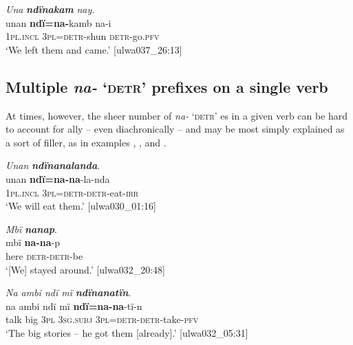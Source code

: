 \ea%
    \label{ex:syntax:340}
          \textit{Una} \textbf{\textit{ndïnakam}} \textit{nay.}\\
\gll    unan    \textbf{ndï=na-}kamb    na-i\\
    1\textsc{pl.incl}  \textsc{3pl=detr-}shun  \textsc{detr}{}-go.\textsc{pfv}\\
\glt `We left them and came.’ [ulwa037\_26:13]
\z

\subsection{Multiple \textit{na-} ‘\textsc{detr}’ prefixes on a single verb}\label{sec:13.8.8}


At times, however, the sheer number of \textit{na-} \textsc{‘detr’} es in a given verb can be hard to account for ally -- even diachronically -- and may be most simply explained as a sort of filler, as in examples , , and .


\ea%
    \label{ex:syntax:341}
          \textit{Unan} \textbf{\textit{ndïnanalanda}}.\\
\gll unan    \textbf{ndï=na-na}{}-la-nda\\
    1\textsc{pl.incl}  \textsc{3pl=detr-detr-}eat-\textsc{irr}\\
\glt `We will eat them.’ [ulwa030\_01:16]
\z

\ea%
    \label{ex:syntax:342}
          \textit{Mbï} \textbf{\textit{nanap}}.\\
\gll mbï  \textbf{na-na}{}-p\\
    here  \textsc{detr-detr-}be\\
\glt `[We] stayed around.’ [ulwa032\_20:48]
\z

\ea%
    \label{ex:syntax:343}
          \textit{Na ambi ndï mï} \textbf{\textit{ndïnanatïn}}.\\
\gll na    ambi  ndï  mï      \textbf{ndï=na-na}{}-tï-n\\
    talk  big    \textsc{3pl}  \textsc{3sg.subj}  \textsc{3pl=detr-detr-}take-\textsc{pfv}\\
\glt `The big stories – he got them [already].’ [ulwa032\_05:31]
\z

